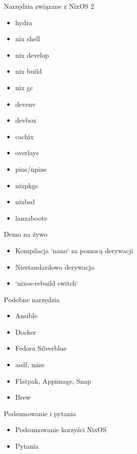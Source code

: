 \documentclass{beamer}
\begin{document}
\begin{frame}{Narzędzia związane z NixOS 2}
    \begin{itemize}
        \item hydra
        \item nix shell
        \item nix develop
        \item nix build
        \item nix gc
        \item devenv
        \item devbox
        \item cachix
        \item overlays
        \item pins/npins
        \item nixpkgs
        \item nixbsd
        \item lanzaboote
    \end{itemize}
\end{frame}

\begin{frame}{Demo na żywo}
    \begin{itemize}
        \item Kompilacja `nano` za pomocą derywacji
        \item Niestandardowa derywacja
        \item `nixos-rebuild switch`
    \end{itemize}
\end{frame}

\begin{frame}{Podobne narzędzia}
    \begin{itemize}
        \item Ansible
        \item Docker
        \item Fedora Silverblue
        \item asdf, mise
        \item Flatpak, Appimage, Snap
        \item Brew
    \end{itemize}
\end{frame}

\begin{frame}{Podsumowanie i pytania}
    \begin{itemize}
        \item Podsumowanie korzyści NixOS
        \item Pytania
    \end{itemize}
\end{frame}
\end{document}
